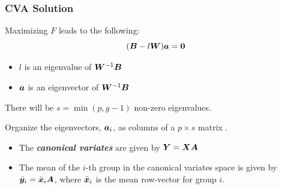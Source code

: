\documentclass{beamer}
\begin{document}
\begin{frame}
  \frametitle{CVA Solution}

Maximizing $F$ leads to the following:
\[
(\bm{B} - l\bm{W})\bm{a} = \bm{0}
\]

\begin{itemize}
\item $l$ is an eigenvalue of $\bm{W}^{-1}\bm{B}$
\item $\bm{a}$ is an eigenvector of $\bm{W}^{-1}\bm{B}$
\end{itemize}

There will be $s=\min(p, g-1)$ non-zero eigenvalues.
\medskip

Organize the eigenvectors, $\bm{a}_i$, as columns of a $p \times s $ matrix .
\begin{itemize}
\item The \textbf{\emph{canonical variates}} are given by $\bm{Y} = \bm{X}\bm{A}$
\item The mean of the $i$-th group in the canonical variates space is given by $\bar{\bm{y}}_i = \bar{\bm{x}}_i\bm{A}$, where $\bar{\bm{x}}_i$ is the mean row-vector for group $i$.
\end{itemize}

\end{frame}
\end{document}
